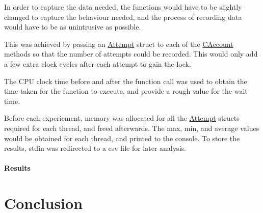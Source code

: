 \documentclass[12pt]{article}
\begin{document}
In order to capture the data needed, the functions would have to be slightly changed to capture the behaviour needed, and the process of recording data would have to be as unintrusive as possible. 

This was achieved by passing an \url{Attempt} struct to each of the \url{CAccount} methods so that the number of attempts could be recorded. This would only add a few extra clock cycles after each attempt to gain the lock.

The CPU clock time before and after the function call was used to obtain the time taken for the function to execute, and provide a rough value for the wait time.

Before each experiement, memory was allocated for all the \url{Attempt} structs required for each thread, and freed afterwards. The max, min, and average values would be obtained for each thread, and printed to the console. To store the results, stdin was redirected to a csv file for later analysis.

\subsection{Results}

\part*{Conclusion}



\end{document}
